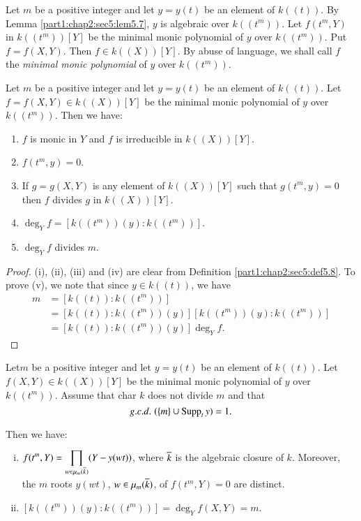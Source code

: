 \begin{defi}\label{part1:chap2:sec5:def5.8}
  Let $m$ be a positive integer and let $y= y(t)$ be an element of $k((t))$. By Lemma \ref{part1:chap2:sec5:lem5.7}, $y$ is algebraic over $k((t^m))$. Let $f(t^m, Y)$ in $k((t^m))[Y]$ be the minimal monic polynomial of $y$ over $k((t^m))$. Put $f=f(X, Y)$. Then $f \in k((X)) [Y]$. By abuse of language, we shall call $f$ the {\em minimal monic polynomial} of $y$ over $k((t^m))$.
\end{defi}

\begin{lemma}\label{part1:chap2:sec5:lem5.9}
  Let $m$ be a positive integer and let $y= y(t)$ be an element of $k((t))$. Let $f=f(X, Y) \in k ((X)) [Y]$ be the minimal monic polynomial of $y$ over $k((t^m))$. Then we have:
\begin{enumerate}[\rm(i)]
\item $f$ is monic in $Y$ and $f$ is irreducible in $k((X))[Y]$.
\item $f(t^m, y)=0$.
\item If $g= g(X, Y)$ is any element of $k((X)) [Y]$ such that $g(t^m, y)=0$ then $f$ divides $g$ in $k((X)) [Y]$.
\item $\deg_Y f=[k((t^m))(y): k((t^m))]$.
\item $\deg_Y f$ divides $m$.
\end{enumerate}
\end{lemma}

\begin{proof}
  (i), (ii), (iii) and (iv) are clear from Definition \ref{part1:chap2:sec5:def5.8}. To prove (v), we note that since $y \in k((t))$, we have
\begin{align*}
  m & = [k((t)) : k((t^m))]\\
  & = [k((t)) : k((t^m))(y)] [k((t^m)) (y) : k((t^m))]\\
  & = [k((t)) : k((t^m))(y)] \deg_Y f.
\end{align*}
\end{proof}

\begin{lemma}\label{part1:chap2:sec5:lem5.10}
  Let\pageoriginale $m$ be a positive integer and let $y= y(t)$ be an element of $k((t))$. Let $f(X, Y) \in k ((X)) [Y]$ be the minimal monic polynomial of $y$ over $k((t^m))$. Assume that char $k$ does not divide $m$ and that
$$
{g.c.d.}\kern.3em (\{ m\} \cup \operatorname{Supp}_t y)=1.
$$
\end{lemma}

Then we have:
\begin{enumerate}[(i)]
\item $\displaystyle{f(t^m, Y)= \prod_{w \in \mu_m (\overline{k})}} (Y - y (wt))$, where $\overline{k}$ is the algebraic closure of $k$. Moreover, the $m$ roots $y(wt)$, $w \in \mu_m (\overline{k})$, of $f(t^m , Y)=0$ are distinct.
\item $[k((t^m))(y): k((t^m))] = \deg_Y f(X, Y)=m$.
\end{enumerate}

